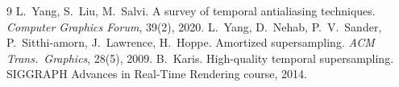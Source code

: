 \documentclass[10pt,twocolumn]{article}
\begin{document}
\begin{thebibliography}{9}\footnotesize\setlength{\itemsep}{0pt}
 L.~Yang, S.~Liu, M.~Salvi. A survey of temporal antialiasing techniques. \emph{Computer Graphics Forum}, 39(2), 2020.
 L.~Yang, D.~Nehab, P.~V.~Sander, P.~Sitthi-amorn, J.~Lawrence, H.~Hoppe. Amortized supersampling. \emph{ACM Trans.\ Graphics}, 28(5), 2009.
 B.~Karis. High-quality temporal supersampling. SIGGRAPH Advances in Real-Time Rendering course, 2014.
\end{thebibliography}

\balance
\end{document}
